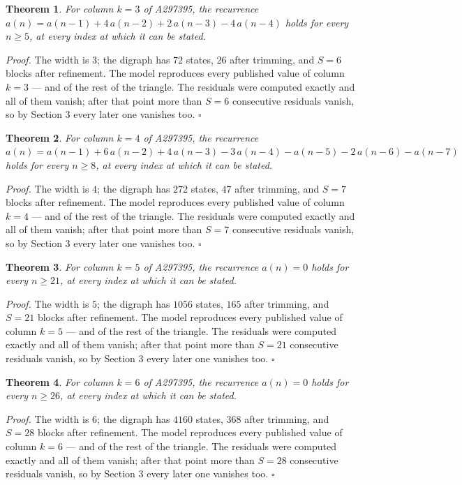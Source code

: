 \documentclass[11pt]{article}
\newtheorem{theorem}{Theorem}
\theoremstyle{definition}
\begin{document}
\begin{theorem} For column $k = 3$ of A297395, the recurrence $a(n) = a(n-1) + 4\,a(n-2) + 2\,a(n-3) - 4\,a(n-4)$ holds for every $n \ge 5$, at every index at which it can be stated.\end{theorem}

{\itshape Proof.} The width is $3$; the digraph has $72$ states, $26$ after trimming, and $S = 6$ blocks after refinement. The model reproduces every published value of column $k = 3$ --- and of the rest of the triangle. The residuals were computed exactly and all of them vanish; after that point more than $S = 6$ consecutive residuals vanish, so by Section 3 every later one vanishes too. $\square$

\begin{theorem} For column $k = 4$ of A297395, the recurrence $a(n) = a(n-1) + 6\,a(n-2) + 4\,a(n-3) - 3\,a(n-4) - a(n-5) - 2\,a(n-6) - a(n-7)$ holds for every $n \ge 8$, at every index at which it can be stated.\end{theorem}

{\itshape Proof.} The width is $4$; the digraph has $272$ states, $47$ after trimming, and $S = 7$ blocks after refinement. The model reproduces every published value of column $k = 4$ --- and of the rest of the triangle. The residuals were computed exactly and all of them vanish; after that point more than $S = 7$ consecutive residuals vanish, so by Section 3 every later one vanishes too. $\square$

\begin{theorem} For column $k = 5$ of A297395, the recurrence $a(n) = 0$ holds for every $n \ge 21$, at every index at which it can be stated.\end{theorem}

{\itshape Proof.} The width is $5$; the digraph has $1056$ states, $165$ after trimming, and $S = 21$ blocks after refinement. The model reproduces every published value of column $k = 5$ --- and of the rest of the triangle. The residuals were computed exactly and all of them vanish; after that point more than $S = 21$ consecutive residuals vanish, so by Section 3 every later one vanishes too. $\square$

\begin{theorem} For column $k = 6$ of A297395, the recurrence $a(n) = 0$ holds for every $n \ge 26$, at every index at which it can be stated.\end{theorem}

{\itshape Proof.} The width is $6$; the digraph has $4160$ states, $368$ after trimming, and $S = 28$ blocks after refinement. The model reproduces every published value of column $k = 6$ --- and of the rest of the triangle. The residuals were computed exactly and all of them vanish; after that point more than $S = 28$ consecutive residuals vanish, so by Section 3 every later one vanishes too. $\square$
\end{document}

